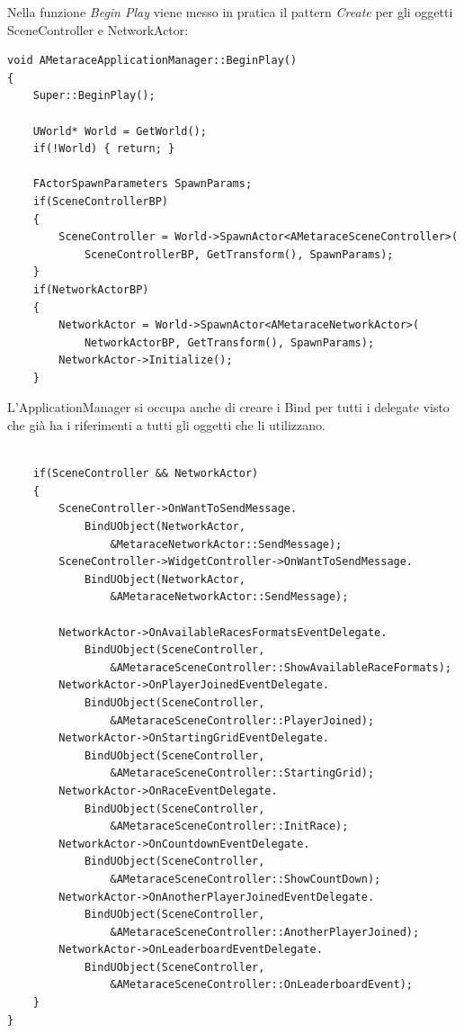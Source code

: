     Nella funzione \textit{Begin Play} viene messo in pratica il pattern \textit{Create} per gli oggetti SceneController e NetworkActor:

    \begin{lstlisting}[caption = Sezione del file source dell'Application Manager dove vengono creati gli oggetti SceneController e NetworkActor]
void AMetaraceApplicationManager::BeginPlay()
{
    Super::BeginPlay();

    UWorld* World = GetWorld();
    if(!World) { return; }

    FActorSpawnParameters SpawnParams;
    if(SceneControllerBP)
    {
        SceneController = World->SpawnActor<AMetaraceSceneController>(
            SceneControllerBP, GetTransform(), SpawnParams);
    }
    if(NetworkActorBP)
    {
        NetworkActor = World->SpawnActor<AMetaraceNetworkActor>(
            NetworkActorBP, GetTransform(), SpawnParams);
        NetworkActor->Initialize();
    }

    \end{lstlisting}

    L'ApplicationManager si occupa anche di creare i Bind per tutti i delegate visto che già ha i riferimenti a tutti gli oggetti che li utilizzano.

    \begin{lstlisting}[firstnumber=22, caption = Sezione del file source dell'Application Manager dove viene formato il Bind dei delegates, label = {alg:bindDelegate}]

    if(SceneController && NetworkActor)
    {
        SceneController->OnWantToSendMessage.
            BindUObject(NetworkActor, 
                &MetaraceNetworkActor::SendMessage);
        SceneController->WidgetController->OnWantToSendMessage.
            BindUObject(NetworkActor, 
                &AMetaraceNetworkActor::SendMessage);

        NetworkActor->OnAvailableRacesFormatsEventDelegate.
            BindUObject(SceneController,
                &AMetaraceSceneController::ShowAvailableRaceFormats);
        NetworkActor->OnPlayerJoinedEventDelegate.
            BindUObject(SceneController,
                &AMetaraceSceneController::PlayerJoined);
        NetworkActor->OnStartingGridEventDelegate.
            BindUObject(SceneController,
                &AMetaraceSceneController::StartingGrid);
        NetworkActor->OnRaceEventDelegate.
            BindUObject(SceneController,
                &AMetaraceSceneController::InitRace);
        NetworkActor->OnCountdownEventDelegate.
            BindUObject(SceneController,
                &AMetaraceSceneController::ShowCountDown);
        NetworkActor->OnAnotherPlayerJoinedEventDelegate.
            BindUObject(SceneController,
                &AMetaraceSceneController::AnotherPlayerJoined);
        NetworkActor->OnLeaderboardEventDelegate.
            BindUObject(SceneController,
                &AMetaraceSceneController::OnLeaderboardEvent);
    }
}        
    \end{lstlisting}

